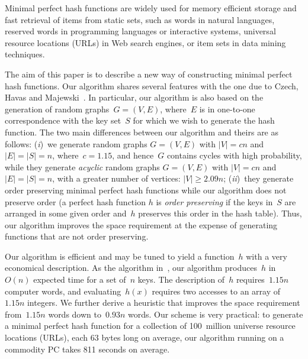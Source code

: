 Minimal perfect hash functions are widely used for memory efficient
storage
and fast retrieval of items from static sets, such as words in natural
languages, reserved words in programming languages or interactive systems,
universal resource locations (URLs) in Web search engines, or item sets in
data mining techniques.

The aim of this paper is to describe a new way of constructing minimal perfect
hash functions.  Our algorithm shares several features with the one due to
Czech, Havas and Majewski~\cite{chm92}.  In particular, our algorithm is also
based on the generation of random graphs~$G=(V,E)$, where~$E$ is in one-to-one
correspondence with the key set~$S$ for which we wish to generate the hash
function.
The two main differences between our algorithm and theirs
are as follows:
(\textit{i})~we generate random graphs
$G = (V, E)$ with $|V|=cn$ and $|E|=|S|=n$, where~$c=1.15$, and hence~$G$
contains cycles with high probability,
while they generate \textit{acyclic} random graphs
$G = (V, E)$ with $|V|=cn$ and $|E|=|S|=n$,
with a greater number of vertices: $|V|\ge2.09n$;
(\textit{ii})~they generate order preserving minimal perfect hash functions
while our algorithm does not preserve order (a perfect hash function $h$ is
\textit{order preserving} if the keys in~$S$ are arranged in some given order
and~$h$ preserves this order in the hash table).  Thus, our algorithm improves
the space requirement at the expense of generating functions that are not
order preserving.

Our algorithm is efficient and may be tuned to yield a function~$h$
with a very economical description.
As the algorithm in~\cite{chm92}, our algorithm produces~$h$
in~$O(n)$ expected time for a set of~$n$ keys.
The description of~$h$ requires~$1.15n$ computer words,
and evaluating~$h(x)$
requires two accesses to an array of~$1.15n$ integers.
We further derive a heuristic that improves the space requirement
from~$1.15n$ words down to~$0.93n$ words.
Our scheme is very practical: to generate a minimal perfect hash function for
a collection of 100~million universe resource locations (URLs), each 63 bytes
long on average, our algorithm running on a commodity PC takes 811 seconds on
average.
